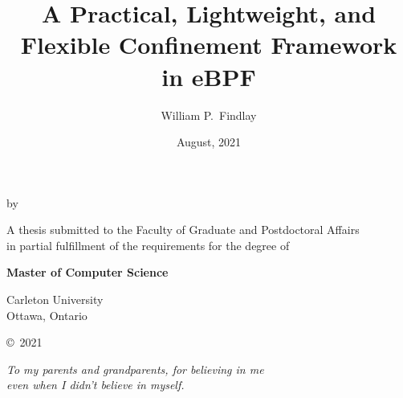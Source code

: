 \documentclass[
  fontsize=12pt,
  titlepage=firstiscover,
  paper=letter,
  oneside,
  cleardoublepage=plain,
  parskip=half-,
  DIV=10,
  parindent,
  appendixprefix,
  chapterprefix,
  listof=totoc,
]{scrbook}
\title{A Practical, Lightweight, and Flexible Confinement Framework in eBPF}
\author{William P.\ Findlay}
\date{August, 2021}
\begin{document}

\makeatletter
\begin{titlepage}
    \begin{center}
      \vspace*{1cm}
      {\LARGE\bfseries \@title}

      \vspace{1cm}
      by
      \vspace{1cm}

      {\itshape\large \@author\/}

      \vfill

      A thesis submitted to the Faculty of Graduate and Postdoctoral Affairs\\
      in partial fulfillment of the requirements for the degree of

      \vspace{3cm}
      {\bfseries Master of Computer Science}
      \vspace{3cm}


      {\@date}
      \vspace{0.5cm}

      Carleton University\\
      Ottawa, Ontario
      \vspace{0.5cm}

      \copyright{}~2021 \@author%
    \end{center}
\end{titlepage}
\makeatother
\cleardoublepage

\renewcommand*{\titlepagestyle}{plain}

\frontmatter%

\vspace*{6em}
\begin{center}
\textit{To my parents and grandparents, for believing in me\\even when I didn't believe in myself.}
\end{center}
\vspace*{\fill}
\end{document}
